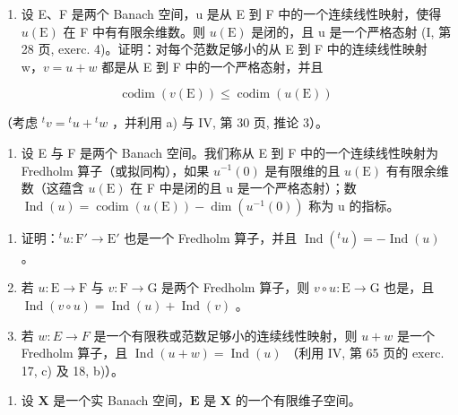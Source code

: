 \begin{enumerate}
\def\labelenumi{\alph{enumi})}
\setcounter{enumi}{1}
\tightlist
\item
  设 E、F 是两个 Banach 空间，u 是从 E 到 F 中的一个连续线性映射，使得 \(u(\mathrm{E})\) 在 F 中有有限余维数。则 \(u(\mathrm{E})\) 是闭的，且 u 是一个严格态射 (I, 第 28 页, exerc. 4)。证明：对每个范数足够小的从 E 到 F 中的连续线性映射 w，\(v = u + w\) 都是从 E 到 F 中的一个严格态射，并且
\end{enumerate}

\[
\operatorname{codim} (v (\mathrm{E})) \leqslant \operatorname{codim} (u (\mathrm{E}))
\]

（考虑 \({}^t v = {}^t u + {}^t w\) ，并利用 a) 与 IV, 第 30 页, 推论 3）。

\begin{enumerate}
\def\labelenumi{\arabic{enumi})}
\setcounter{enumi}{20}
\tightlist
\item
  设 E 与 F 是两个 Banach 空间。我们称从 E 到 F 中的一个连续线性映射为 Fredholm 算子（或拟同构），如果 \(u^{-1}(0)\) 是有限维的且 \(u(\mathrm{E})\) 有有限余维数（这蕴含 \(u(\mathrm{E})\) 在 F 中是闭的且 u 是一个严格态射）；数 \(\operatorname{Ind}(u) = \operatorname{codim}(u(\mathrm{E})) - \dim(u^{-1}(0))\) 称为 u 的指标。
\end{enumerate}

\begin{enumerate}
\def\labelenumi{\alph{enumi})}
\item
  证明：\({}^t u: \mathrm{F}' \to \mathrm{E}'\) 也是一个 Fredholm 算子，并且 \(\operatorname{Ind}({}^t u) = -\operatorname{Ind}(u)\) 。
\item
  若 \(u: \mathrm{E} \to \mathrm{F}\) 与 \(v: \mathrm{F} \to \mathrm{G}\) 是两个 Fredholm 算子，则 \(v \circ u: \mathrm{E} \to \mathrm{G}\) 也是，且 \(\operatorname{Ind}(v \circ u) = \operatorname{Ind}(u) + \operatorname{Ind}(v)\) 。
\item
  若 \(w: E \to F\) 是一个有限秩或范数足够小的连续线性映射，则 \(u + w\) 是一个 Fredholm 算子，且 \(\operatorname{Ind}(u + w) = \operatorname{Ind}(u)\) （利用 IV, 第 65 页的 exerc. 17, c) 及 18, b)）。
\end{enumerate}

\begin{enumerate}
\def\labelenumi{\arabic{enumi})}
\setcounter{enumi}{21}
\tightlist
\item
  设 \(\mathbf{X}\) 是一个实 Banach 空间，\(\mathbf{E}\) 是 \(\mathbf{X}\) 的一个有限维子空间。
\end{enumerate}

